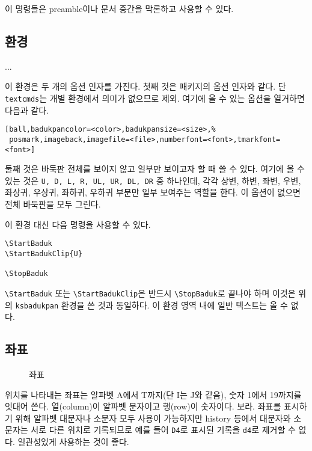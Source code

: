 \documentclass[figtabcapt,a4paper]{oblivoir}
\begin{document}
이 명령들은 preamble이나 문서 중간을 막론하고 사용할 수 있다.

\subsection{환경}

\begin{boxedverbatim}
\begin{ksbadukpan}[<options>][<pos>]
...
\end{ksbadukpan}
\end{boxedverbatim}

이 환경은 두 개의 옵션 인자를 가진다. 첫째 것은 패키지의 옵션 인자와 같다. 단 \texttt{textcmds}는
개별 환경에서 의미가 없으므로 제외. 여기에 올 수 있는 옵션을 열거하면 다음과 같다.
\begin{verbatim}
[ball,badukpancolor=<color>,badukpansize=<size>,%
 posmark,imageback,imagefile=<file>,numberfont=<font>,tmarkfont=<font>]
\end{verbatim}

둘째 것은 바둑판 전체를 보이지 않고 일부만 보이고자 할 때 쓸 수 있다. 여기에 올 수 있는 것은
\texttt{U, D, L, R, UL, UR, DL, DR} 중 하나인데, 각각 상변, 하변, 좌변, 우변,
좌상귀, 우상귀, 좌하귀, 우하귀 부분만 일부 보여주는 역할을 한다. 이 옵션이 없으면 전체 바둑판을 모두 그린다.

이 환경 대신 다음 명령을 사용할 수 있다.
\begin{verbatim}
\StartBaduk
\StartBadukClip{U}

\StopBaduk
\end{verbatim}
\verb|\StartBaduk| 또는 \verb|\StartBadukClip|은 반드시 \verb|\StopBaduk|로 끝나야 하며 이것은
위의 \verb|ksbadukpan| 환경을 쓴 것과 동일하다. 이 환경 영역 내에 일반 텍스트는 올 수 없다.

\subsection{좌표}

\begin{figure}[h]
\centering
\begin{ksbadukpan}[posmark,imageback,imagefile=badukpan.jpg]
\end{ksbadukpan}
\caption{좌표}\label{fig:badukpan}
\end{figure}

위치를 나타내는 좌표는 알파벳 A에서 T까지(단 I는 J와 같음), 숫자 1에서 19까지를 잇대어 쓴다. 열(column)이 알파벳 문자이고 행(row)이 숫자이다. \를 보라.
좌표를 표시하기 위해 알파벳 대문자나 소문자 모두 사용이 가능하지만 history 등에서 대문자와 소문자는 서로 다른 위치로 기록되므로 예를 들어 \texttt{D4}로 표시된 기록을 \texttt{d4}로 제거할 수 없다.
일관성있게 사용하는 것이 좋다.
\end{document}
